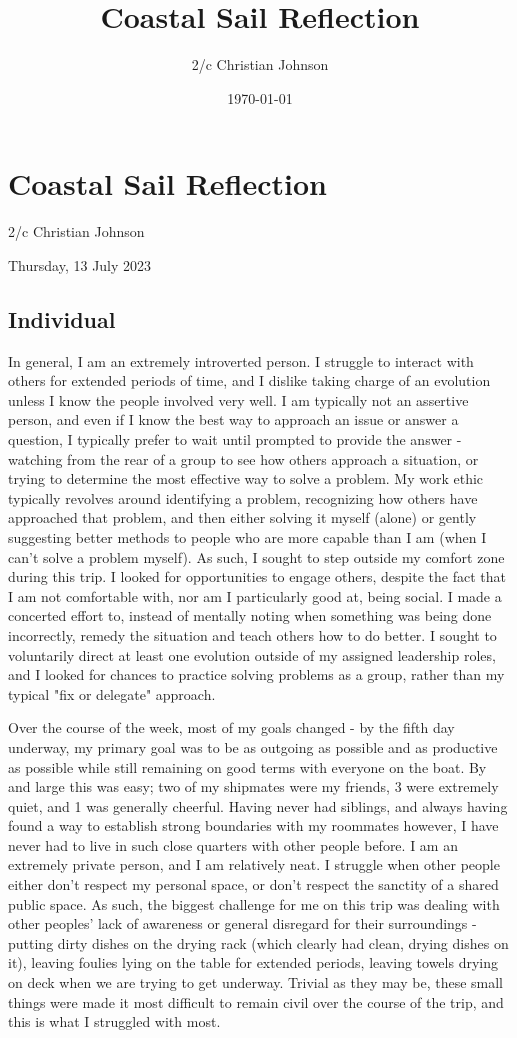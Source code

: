 \documentclass[12pt]{article}
\author{2/c Christian Johnson}
\date{\today}
\title{Coastal Sail Reflection}
\begin{document}
\setlength\parindent{0pt}


\section*{Coastal Sail Reflection}
\label{sec:orgfde19f1}
2/c Christian Johnson

Thursday, 13 July 2023

\subsection*{Individual}
\label{sec:orga5f5498}
In general, I am an extremely introverted person. I struggle to interact with others for extended periods of time, and I dislike taking charge of an evolution unless I know the people involved very well. I am typically not an assertive person, and even if I know the best way to approach an issue or answer a question, I typically prefer to wait until prompted to provide the answer - watching from the rear of a group to see how others approach a situation, or trying to determine the most effective way to solve a problem. My work ethic typically revolves around identifying a problem, recognizing how others have approached that problem, and then either solving it myself (alone) or gently suggesting better methods to people who are more capable than I am (when I can't solve a problem myself). As such, I sought to step outside my comfort zone during this trip. I looked for opportunities to engage others, despite the fact that I am not comfortable with, nor am I particularly good at, being social. I made a concerted effort to, instead of mentally noting when something was being done incorrectly, remedy the situation and teach others how to do better. I sought to voluntarily direct at least one evolution outside of my assigned leadership roles, and I looked for chances to practice solving problems as a group, rather than my typical "fix or delegate" approach.  

Over the course of the week, most of my goals changed - by the fifth day underway, my primary goal was to be as outgoing as possible and as productive as possible while still remaining on good terms with everyone on the boat. By and large this was easy; two of my shipmates were my friends, 3 were extremely quiet, and 1 was generally cheerful. Having never had siblings, and always having found a way to establish strong boundaries with my roommates however, I have never had to live in such close quarters with other people before. I am an extremely private person, and I am relatively neat. I struggle when other people either don't respect my personal space, or don't respect the sanctity of a shared public space. As such, the biggest challenge for me on this trip was dealing with other peoples' lack of awareness or general disregard for their surroundings - putting dirty dishes on the drying rack (which clearly had clean, drying dishes on it), leaving foulies lying on the table for extended periods, leaving towels drying on deck when we are trying to get underway. Trivial as they may be, these small things were made it most difficult to remain civil over the course of the trip, and this is what I struggled with most.
\end{document}
